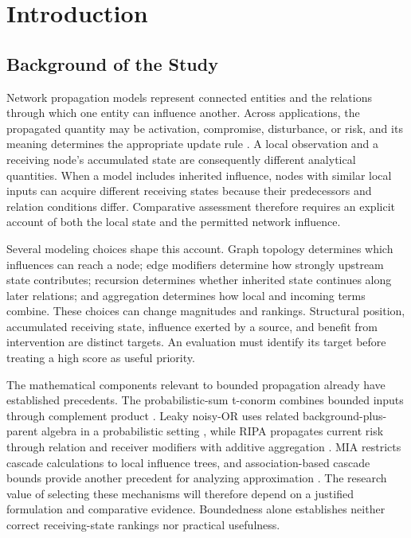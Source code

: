\section{Introduction}

\subsection{Background of the Study}\label{background-of-the-study}

Network propagation models represent connected entities and the relations
through which one entity can influence another. Across applications, the
propagated quantity may be activation, compromise, disturbance, or risk,
and its meaning determines the appropriate update rule
\citep{kempe2003,munoz2017,faraji2026}. A local observation and a receiving
node's accumulated state are consequently different analytical quantities.
When a model includes inherited influence, nodes with similar local inputs
can acquire different receiving states because their predecessors and
relation conditions differ. Comparative assessment therefore requires an
explicit account of both the local state and the permitted network influence.

Several modeling choices shape this account. Graph topology determines
which influences can reach a node; edge modifiers determine how strongly
upstream state contributes; recursion determines whether inherited state
continues along later relations; and aggregation determines how local and
incoming terms combine. These choices can change magnitudes and rankings.
Structural position, accumulated receiving state, influence exerted by a
source, and benefit from intervention are distinct targets. An evaluation
must identify its target before treating a high score as useful priority.

The mathematical components relevant to bounded propagation already have
established precedents. The probabilistic-sum t-conorm combines bounded
inputs through complement product \citep{klement2004}. Leaky noisy-OR uses
related background-plus-parent algebra in a probabilistic setting
\citep{fallet2012}, while RIPA propagates current risk through relation and
receiver modifiers with additive aggregation \citep{faraji2026}. MIA restricts
cascade calculations to local influence trees, and association-based cascade
bounds provide another precedent for analyzing approximation
\citep{chen2010mia,abbe2017,abbe2020}. The research value of selecting these mechanisms
will therefore depend on a justified formulation and comparative evidence.
Boundedness alone establishes neither correct receiving-state rankings nor
practical usefulness.


